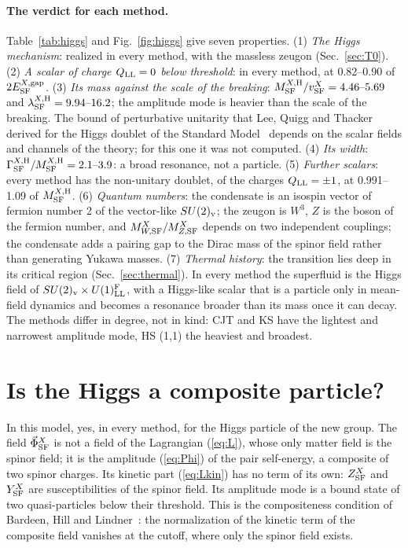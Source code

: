 \documentclass[aps,prd,twocolumn,superscriptaddress,nofootinbib,floatfix,longbibliography]{revtex4-2}
\newcommand{\LL}{{\rm LL}}
\newcommand{\SF}{{\rm SF}}
\begin{document}
\paragraph*{The verdict for each method.}
Table~\ref{tab:higgs} and Fig.~\ref{fig:higgs} give seven properties.
(1) \emph{The Higgs mechanism}: realized in every method, with the massless zeugon (Sec.~\ref{sec:T0}).
(2) \emph{A scalar of charge $Q_\LL=0$ below threshold}: in every method, at 0.82\mbox{--}0.90 of $2E^{X,{\rm gap}}_\SF$.
(3) \emph{Its mass against the scale of the breaking}: $M^{X,{\rm H}}_\SF/v^X_\SF=4.46\mbox{--}5.69$ and
$\lambda^{X,{\rm H}}_\SF=9.94\mbox{--}16.2$; the amplitude mode is heavier than the scale of the breaking. The bound of
perturbative unitarity that Lee, Quigg and Thacker derived for the Higgs doublet of the Standard Model~\cite{LQT1977}
depends on the scalar fields and channels of the theory; for this one it was not computed.
(4) \emph{Its width}: $\Gamma^{X,{\rm H}}_\SF/M^{X,{\rm H}}_\SF=2.1\mbox{--}3.9$: a broad resonance, not a particle.
(5) \emph{Further scalars}: every method has the non-unitary doublet, of the charges $Q_\LL=\pm1$, at 0.991\mbox{--}1.09 of
$M^{X,{\rm H}}_\SF$.
(6) \emph{Quantum numbers}: the condensate is an isospin vector of fermion number 2 of the vector-like $SU(2)_{\rm v}$; the
zeugon is $W^3$, $Z$ is the boson of the fermion number, and $M^X_{W,\SF}/M^X_{Z,\SF}$ depends on two independent
couplings; the condensate adds a pairing gap to the Dirac mass of the spinor field rather than generating Yukawa masses.
(7) \emph{Thermal history}: the transition lies deep in its critical region (Sec.~\ref{sec:thermal}).
In every method the superfluid is the Higgs field of $SU(2)_{\rm v}\times U(1)^{\rm F}_\LL$, with a Higgs-like scalar that is
a particle only in mean-field dynamics and becomes a resonance broader than its mass once it can decay. The methods differ
in degree, not in kind: CJT and KS have the lightest and narrowest amplitude mode, HS (1,1) the heaviest and broadest.

\section{Is the Higgs a composite particle?}
\label{sec:composite}

In this model, yes, in every method, for the Higgs particle of the new group. The field $\vec\Phi^X_\SF$ is not a field of
the Lagrangian (\ref{eq:L}), whose only matter field is the spinor field; it is the amplitude (\ref{eq:Phi}) of the pair
self-energy, a composite of two spinor charges. Its kinetic part (\ref{eq:Lkin}) has no term of its own: $Z^X_\SF$ and
$Y^X_\SF$ are susceptibilities of the spinor field. Its amplitude mode is a bound state of two quasi-particles below their
threshold. This is the compositeness condition of Bardeen, Hill and Lindner~\cite{BHL1990}: the normalization of the kinetic
term of the composite field vanishes at the cutoff, where only the spinor field exists.
\end{document}
